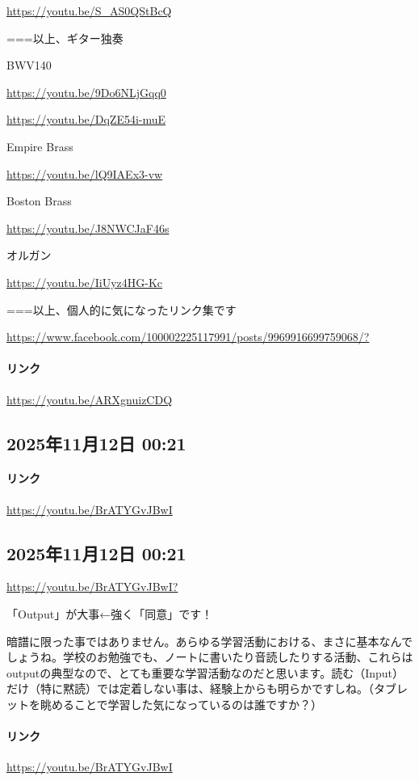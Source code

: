 \url{https://youtu.be/S_AS0QStBcQ}

===以上、ギター独奏

BWV140

\url{https://youtu.be/9Do6NLjGqq0}

\url{https://youtu.be/DqZE54i-muE}

Empire Brass

\url{https://youtu.be/lQ9IAEx3-vw}

Boston Brass

\url{https://youtu.be/J8NWCJaF46s}

オルガン

\url{https://youtu.be/IiUyz4HG-Kc}

===以上、個人的に気になったリンク集です

\url{https://www.facebook.com/100002225117991/posts/9969916699759068/?}

\paragraph{リンク}
\url{https://youtu.be/ARXgnuizCDQ}

\subsection*{2025年11月12日 00:21}

\paragraph{リンク}
\url{https://youtu.be/BrATYGvJBwI}

\subsection*{2025年11月12日 00:21}

\url{https://youtu.be/BrATYGvJBwI?}

「Output」が大事←強く「同意」です！

暗譜に限った事ではありません。あらゆる学習活動における、まさに基本なんでしょうね。学校のお勉強でも、ノートに書いたり音読したりする活動、これらはoutputの典型なので、とても重要な学習活動なのだと思います。読む（Input）だけ（特に黙読）では定着しない事は、経験上からも明らかですしね。（タブレットを眺めることで学習した気になっているのは誰ですか？）

\paragraph{リンク}
\url{https://youtu.be/BrATYGvJBwI}

